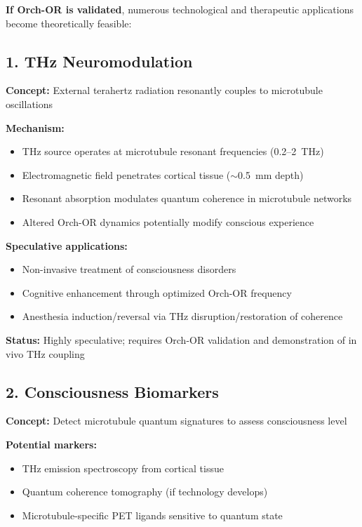 \textbf{If Orch-OR is validated}, numerous technological and therapeutic applications become theoretically feasible:

\subsection{1. THz Neuromodulation}

\textbf{Concept:} External terahertz radiation resonantly couples to microtubule oscillations

\textbf{Mechanism:}
\begin{itemize}
\item THz source operates at microtubule resonant frequencies (0.2--2~THz)
\item Electromagnetic field penetrates cortical tissue ($\sim$0.5~mm depth)
\item Resonant absorption modulates quantum coherence in microtubule networks
\item Altered Orch-OR dynamics potentially modify conscious experience
\end{itemize}

\textbf{Speculative applications:}
\begin{itemize}
\item Non-invasive treatment of consciousness disorders
\item Cognitive enhancement through optimized Orch-OR frequency
\item Anesthesia induction/reversal via THz disruption/restoration of coherence
\end{itemize}

\textbf{Status:} Highly speculative; requires Orch-OR validation and demonstration of in vivo THz coupling

\subsection{2. Consciousness Biomarkers}

\textbf{Concept:} Detect microtubule quantum signatures to assess consciousness level

\textbf{Potential markers:}
\begin{itemize}
\item THz emission spectroscopy from cortical tissue
\item Quantum coherence tomography (if technology develops)
\item Microtubule-specific PET ligands sensitive to quantum state
\end{itemize}

